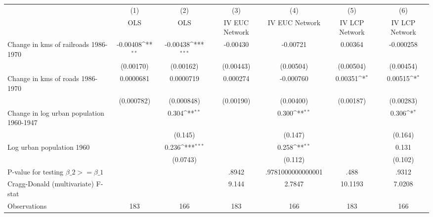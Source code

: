 {
\def\sym#1{\ifmmode^{#1}\else\(^{#1}\)\fi}
\begin{tabular}{l*{6}{c}}
\hline\hline
                &\multicolumn{1}{c}{(1)}&\multicolumn{1}{c}{(2)}&\multicolumn{1}{c}{(3)}&\multicolumn{1}{c}{(4)}&\multicolumn{1}{c}{(5)}&\multicolumn{1}{c}{(6)}\\
                &\multicolumn{1}{c}{OLS}&\multicolumn{1}{c}{OLS}&\multicolumn{1}{c}{IV EUC Network}&\multicolumn{1}{c}{IV EUC Network}&\multicolumn{1}{c}{IV LCP Network}&\multicolumn{1}{c}{IV LCP Network}\\
\hline
Change in kms of railroads 1986-1970& -0.00408\sym{**} & -0.00438\sym{***}& -0.00430         & -0.00721         &  0.00364         &-0.000258         \\
                &(0.00170)         &(0.00162)         &(0.00443)         &(0.00504)         &(0.00504)         &(0.00454)         \\
[1em]
Change in kms of roads 1986-1970&0.0000681         &0.0000719         & 0.000274         &-0.000760         &  0.00351\sym{*}  &  0.00515\sym{*}  \\
                &(0.000782)         &(0.000848)         &(0.00190)         &(0.00400)         &(0.00187)         &(0.00283)         \\
[1em]
Change in log urban population 1960-1947&                  &    0.304\sym{**} &                  &    0.300\sym{**} &                  &    0.306\sym{*}  \\
                &                  &  (0.145)         &                  &  (0.147)         &                  &  (0.164)         \\
[1em]
Log urban population 1960&                  &    0.236\sym{***}&                  &    0.258\sym{**} &                  &    0.131         \\
                &                  & (0.0743)         &                  &  (0.112)         &                  &  (0.102)         \\
\hline
P-value for testing $\beta\_{2} >= \beta\_{1}$&                  &                  &    .8942         &.9781000000000001         &     .488         &    .9312         \\
Cragg-Donald (multivariate) F-stat&                  &                  &    9.144         &   2.7847         &  10.1193         &   7.0208         \\
Observations    &      183         &      166         &      183         &      166         &      183         &      166         \\
\hline\hline
\end{tabular}
}
